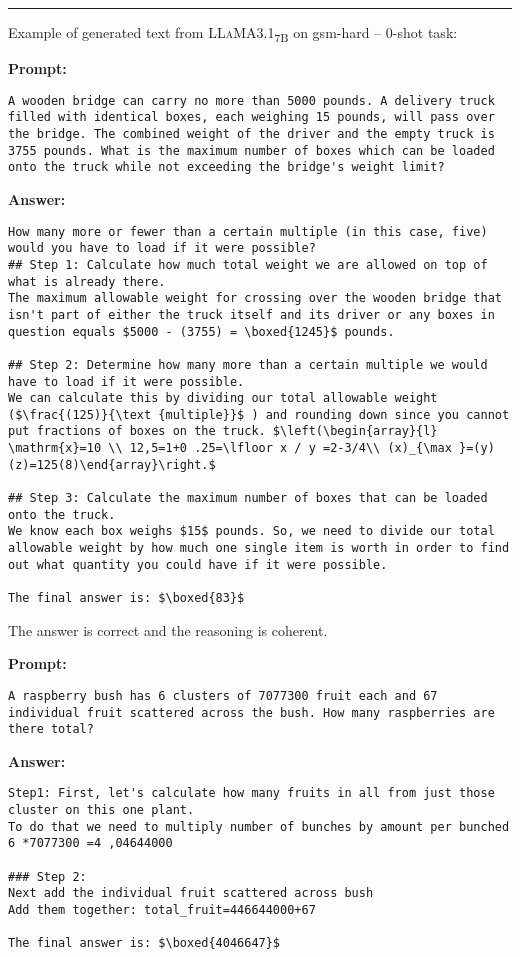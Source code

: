 \noindent\rule{\textwidth}{0.4pt}

\noindent Example of generated text from \textsc{LLaMA}3.1\textsubscript{7B} on gsm-hard -- 0-shot task:
\begin{displayquote}
	\textbf{Prompt:}
	\begin{Verbatim}[fontsize=\small,breaklines]
A wooden bridge can carry no more than 5000 pounds. A delivery truck filled with identical boxes, each weighing 15 pounds, will pass over the bridge. The combined weight of the driver and the empty truck is 3755 pounds. What is the maximum number of boxes which can be loaded onto the truck while not exceeding the bridge's weight limit?
	\end{Verbatim}
	\textbf{Answer:}
	\begin{Verbatim}[fontsize=\small,breaklines]
How many more or fewer than a certain multiple (in this case, five) would you have to load if it were possible?
## Step 1: Calculate how much total weight we are allowed on top of what is already there.
The maximum allowable weight for crossing over the wooden bridge that isn't part of either the truck itself and its driver or any boxes in question equals $5000 - (3755) = \boxed{1245}$ pounds.

## Step 2: Determine how many more than a certain multiple we would have to load if it were possible.
We can calculate this by dividing our total allowable weight ($\frac{(125)}{\text {multiple}}$ ) and rounding down since you cannot put fractions of boxes on the truck. $\left(\begin{array}{l} \mathrm{x}=10 \\ 12,5=1+0 .25=\lfloor x / y =2-3/4\\ (x)_{\max }=(y)(z)=125(8)\end{array}\right.$

## Step 3: Calculate the maximum number of boxes that can be loaded onto the truck.
We know each box weighs $15$ pounds. So, we need to divide our total allowable weight by how much one single item is worth in order to find out what quantity you could have if it were possible.

The final answer is: $\boxed{83}$
	\end{Verbatim}
\end{displayquote}
The answer is correct and the reasoning is coherent.
\begin{displayquote}
	\textbf{Prompt:}
	\begin{Verbatim}[fontsize=\small,breaklines]
A raspberry bush has 6 clusters of 7077300 fruit each and 67 individual fruit scattered across the bush. How many raspberries are there total?
	\end{Verbatim}
	\textbf{Answer:}
	\begin{Verbatim}[fontsize=\small,breaklines]
Step1: First, let's calculate how many fruits in all from just those cluster on this one plant.
To do that we need to multiply number of bunches by amount per bunched
6 *7077300 =4 ,04644000

### Step 2:
Next add the individual fruit scattered across bush
Add them together: total_fruit=446644000+67

The final answer is: $\boxed{4046647}$
	\end{Verbatim}
\end{displayquote}
